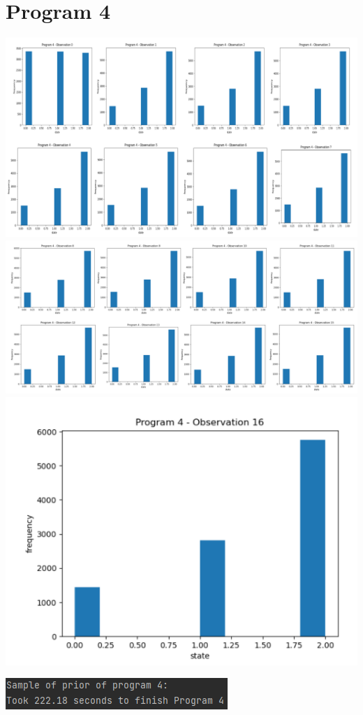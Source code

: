 \documentclass[10pt]{homeworg}
\begin{document}
\section*{Program 4}
\begin{center}
\includegraphics[scale=0.35]{../figures/program3_1.png}
\includegraphics[scale=0.35]{../figures/program3_2.png}
\includegraphics[scale=0.4]{../figures/program3_3.png}
\end{center}

\begin{center}
\includegraphics[scale=0.8]{../figures/program3_time.png}
\end{center}
\end{document}
